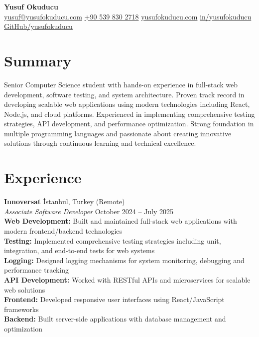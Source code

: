 \documentclass[10pt,a4paper]{extarticle}
\begin{document}
\begin{center}
    \begin{minipage}{\textwidth}
        \centering
        {\LARGE\textbf{Yusuf Okuducu}}\\[20pt]
        \href{mailto:yusuf@yusufokuducu.com}{yusuf@yusufokuducu.com} \quad
        \href{tel:+905398302718}{+90 539 830 2718} \quad
        \href{https://yusufokuducu.com}{yusufokuducu.com} \quad
        \href{https://linkedin.com/in/yusufokuducu}{in/yusufokuducu} \quad
        \href{https://github.com/yusufokuducu}{GitHub/yusufokuducu}
    \end{minipage}
\end{center}

\vspace{9pt}

\section{Summary}
Senior Computer Science student with hands-on experience in full-stack web development, 
software testing, and system architecture. Proven track record in developing scalable 
web applications using modern technologies including React, Node.js, and cloud platforms. 
Experienced in implementing comprehensive testing strategies, API development, and 
performance optimization. Strong foundation in multiple programming languages and 
passionate about creating innovative solutions through continuous learning and 
technical excellence.

\vspace{9pt}

\section{Experience}

\vspace{5pt}
\noindent\textbf{Innoversat} İstanbul, Turkey \hfill (Remote)\\
\textit{Associate Software Developer} \hfill October 2024 -- July 2025\\
\textbf{Web Development:} Built and maintained full-stack web applications with modern frontend/backend technologies\\
\textbf{Testing:} Implemented comprehensive testing strategies including unit, integration, and end-to-end tests for web systems\\
\textbf{Logging:} Designed logging mechanisms for system monitoring, debugging and performance tracking\\
\textbf{API Development:} Worked with RESTful APIs and microservices for scalable web solutions\\
\textbf{Frontend:} Developed responsive user interfaces using React/JavaScript frameworks\\
\textbf{Backend:} Built server-side applications with database management and optimization\\
\end{document}
